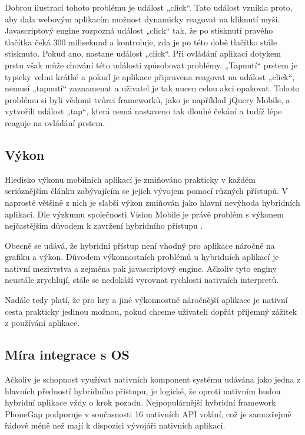Dobrou ilustrací tohoto problému je událost „click“. Tato událost vznikla proto, aby dala webovým aplikacím možnost dynamicky reagovat na kliknutí myši. Javascriptový engine rozpozná událost „click“ tak, že po stisknutí pravého tlačítka čeká 300 milisekund a kontroluje, zda je po této době tlačítko stále stisknuto. Pokud ano, nastane událost „click“. Při ovládání aplikací dotykem prstu však může chování této události způsobovat problémy. „Tapnutí“ prstem je typicky velmi krátké a pokud je aplikace připravena reagovat na událost „click“, nemusí „tapnutí“ zaznamenat a uživatel je tak nucen celou akci opakovat. Tohoto problému si byli vědomi tvůrci frameworků, jako je například jQuery Mobile, a vytvořili událost „tap“, která nemá nastaveno tak dlouhé čekání a tudíž lépe reaguje na ovládání prstem.

\subsection{Výkon}
Hledisko výkonu mobilních aplikací je zmiňováno prakticky v každém serióznějším článku zabývajícím se jejich vývojem pomocí různých přístupů. V naprosté většině z nich je slabší výkon zmiňován jako hlavní nevýhoda hybridních aplikací. Dle výzkumu společnosti Vision Mobile je právě problém s výkonem nejčastějším důvodem k zavržení hybridního přístupu \cite{visionmobile_survey}.

Obecně se udává, že hybridní přístup není vhodný pro aplikace náročné na grafiku a výkon. Důvodem výkonnostních problémů u hybridních aplikací je nativní mezivrstva a zejména pak javascriptový engine. Ačkoliv tyto enginy neustále zrychlují, stále se nedokáží vyrovnat rychlosti nativních interpretů.

Nadále tedy platí, že pro hry a jiné výkonnostně náročnější aplikace je nativní cesta prakticky jedinou možnou, pokud chceme uživateli dopřát příjemný zážitek z používání aplikace.

\subsection{Míra integrace s OS}
Ačkoliv je schopnost využívat nativních komponent systému udávána jako jedna z hlavních předností hybridního přístupu, je logické, že oproti nativním budou hybridní aplikace vždy o krok pozadu. Nejpopulárnější hybridní framework PhoneGap podporuje v současnosti 16 nativních API volání, což je samozřejmě řádově méně než mají k dispozici vývojáři nativních aplikací.

